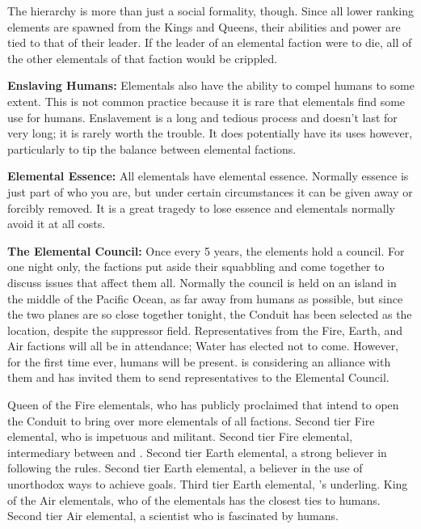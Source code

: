 \documentclass[blue]{elementals}
\begin{document}
The hierarchy is more than just a social formality, though. Since all lower ranking elements are spawned from the Kings and Queens, their abilities and power are tied to that of their leader. If the leader of an elemental faction were to die, all of the other elementals of that faction would be crippled.

{\bf Enslaving Humans:}
Elementals also have the ability to compel humans to some extent. This is not common practice because it is rare that elementals find some use for humans. Enslavement is a long and tedious process and doesn't last for very long; it is rarely worth the trouble. It does potentially have its uses however, particularly to tip the balance between elemental factions.

{\bf Elemental Essence:}
All elementals have elemental essence. Normally essence is just part of who you are, but under certain circumstances it can be given away or forcibly removed. It is a great tragedy to lose essence and elementals normally avoid it at all costs.

{\bf The Elemental Council:}
Once every 5 years, the elements hold a council. For one night only, the factions put aside their squabbling and come together to discuss issues that affect them all. Normally the council is held on an island in the middle of the Pacific Ocean, as far away from humans as possible, but since the two planes are so close together tonight, the Conduit has been selected as the location, despite the suppressor field.  Representatives from the Fire, Earth, and Air factions will all be in attendance; Water has elected not to come.  However, for the first time ever, humans will be present.  \cKing{} is considering an alliance with them and has invited them to send representatives to the Elemental Council.

\begin{members}
  \member{\cQueen{}} Queen of the Fire elementals, who has publicly proclaimed that \cQueen{\they} intend to open the Conduit to bring over more elementals of all factions.
  \member{\cPyro{}} Second tier Fire elemental, who is impetuous and militant.
  \member{\cJuliet{}} Second tier Fire elemental, intermediary between \cQueen{} and \cKing{}.
  \member{\cLoyal{}} Second tier Earth elemental, a strong believer in following the rules.
  \member{\cRogue{}} Second tier Earth elemental, a believer in the use of unorthodox ways to achieve goals.
  \member{\cMinion{}} Third tier Earth elemental, \cLoyal{}'s underling.
  \member{\cKing{}} King of the Air elementals, who of the elementals has the closest ties to humans.
  \member{\cNaturalist{}} Second tier Air elemental, a scientist who is fascinated by humans.
\end{members}
\end{document}
